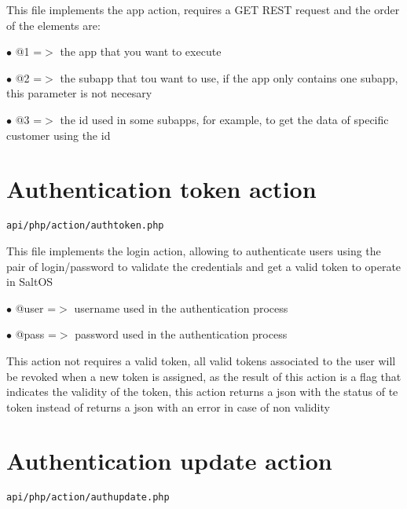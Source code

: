 \documentclass[a4paper]{book}
\begin{document}
This file implements the app action, requires a GET REST request
and the order of the elements are:

\begin{compactitem}
\item[\color{myblue}$\bullet$] @1 =$>$ the app that you want to execute
\item[\color{myblue}$\bullet$] @2 =$>$ the subapp that tou want to use, if the app only contains
      one subapp, this parameter is not necesary
\item[\color{myblue}$\bullet$] @3 =$>$ the id used in some subapps, for example, to get the data
      of specific customer using the id
\end{compactitem}

\hypertarget{toc6}{}
\section{Authentication token action}

\begin{lstlisting}
api/php/action/authtoken.php
\end{lstlisting}

This file implements the login action, allowing to authenticate users using the pair
of login/password to validate the credentials and get a valid token to operate in SaltOS

\begin{compactitem}
\item[\color{myblue}$\bullet$] @user =$>$ username used in the authentication process
\item[\color{myblue}$\bullet$] @pass =$>$ password used in the authentication process
\end{compactitem}

This action not requires a valid token, all valid tokens associated
to the user will be revoked when a new token is assigned, as the result of this action
is a flag that indicates the validity of the token, this action returns a json with the
status of te token instead of returns a json with an error in case of non validity

\hypertarget{toc7}{}
\section{Authentication update action}

\begin{lstlisting}
api/php/action/authupdate.php
\end{lstlisting}
\end{document}
